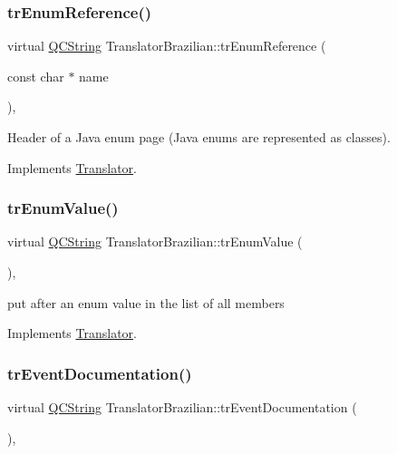 \subsubsection{\texorpdfstring{trEnumReference()}{trEnumReference()}}
{\footnotesize\ttfamily virtual \mbox{\hyperlink{class_q_c_string}{Q\+C\+String}} Translator\+Brazilian\+::tr\+Enum\+Reference (\begin{DoxyParamCaption}\item[{const char $\ast$}]{name }\end{DoxyParamCaption})\hspace{0.3cm}{\ttfamily [inline]}, {\ttfamily [virtual]}}

Header of a Java enum page (Java enums are represented as classes). 

Implements \mbox{\hyperlink{class_translator}{Translator}}.

\mbox{\label{class_translator_brazilian_af0d43dbe3d66592929606d2e8625669b}} 
\subsubsection{\texorpdfstring{trEnumValue()}{trEnumValue()}}
{\footnotesize\ttfamily virtual \mbox{\hyperlink{class_q_c_string}{Q\+C\+String}} Translator\+Brazilian\+::tr\+Enum\+Value (\begin{DoxyParamCaption}{ }\end{DoxyParamCaption})\hspace{0.3cm}{\ttfamily [inline]}, {\ttfamily [virtual]}}

put after an enum value in the list of all members 

Implements \mbox{\hyperlink{class_translator}{Translator}}.

\mbox{\label{class_translator_brazilian_ae16fbd16a90bb95a84cfc48ef107b28a}} 
\subsubsection{\texorpdfstring{trEventDocumentation()}{trEventDocumentation()}}
{\footnotesize\ttfamily virtual \mbox{\hyperlink{class_q_c_string}{Q\+C\+String}} Translator\+Brazilian\+::tr\+Event\+Documentation (\begin{DoxyParamCaption}{ }\end{DoxyParamCaption})\hspace{0.3cm}{\ttfamily [inline]}, {\ttfamily [virtual]}}

